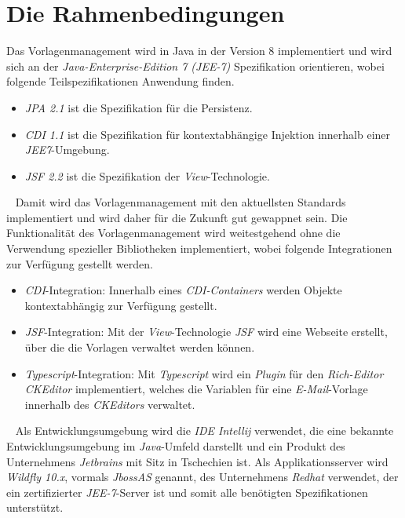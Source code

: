 \section{Die Rahmenbedingungen}
Das Vorlagenmanagement wird in Java in der Version 8 implementiert und wird sich an der \emph{Java-Enterprise-Edition 7 (JEE-7)} Spezifikation orientieren, wobei folgende Teilspezifikationen Anwendung finden.
\begin{itemize}
	\item \emph{JPA 2.1} ist die Spezifikation für die Persistenz.
	\item \emph{CDI 1.1} ist die Spezifikation für kontextabhängige Injektion innerhalb einer \emph{JEE7}-Umgebung.
	\item \emph{JSF 2.2} ist die Spezifikation der \emph{View}-Technologie. 
\end{itemize}
\ \newline
Damit wird das Vorlagenmanagement mit den aktuellsten Standards implementiert und wird daher für die Zukunft gut gewappnet sein. Die Funktionalität des Vorlagenmanagement wird weitestgehend ohne die Verwendung spezieller Bibliotheken implementiert, wobei folgende Integrationen zur Verfügung gestellt werden.
\begin{itemize}
	\item \emph{CDI}-Integration:
	\newline
	Innerhalb eines \emph{CDI-Containers} werden Objekte kontextabhängig zur Verfügung gestellt.
	\item \emph{JSF}-Integration:
	\newline
	Mit der \emph{View}-Technologie \emph{JSF} wird eine Webseite erstellt, über die die Vorlagen verwaltet werden können.
	\item \emph{Typescript}-Integration:
	\newline
	Mit \emph{Typescript} wird ein \emph{Plugin} für den \emph{Rich-Editor CKEditor} implementiert, welches die Variablen für eine \emph{E-Mail}-Vorlage innerhalb des \emph{CKEditors} verwaltet.
\end{itemize} 
\ \newline
Als Entwicklungsumgebung wird die \emph{IDE Intellij} verwendet, die eine bekannte Entwicklungsumgebung im \emph{Java}-Umfeld darstellt und ein Produkt des Unternehmens \emph{Jetbrains} mit Sitz in Tschechien ist. Als Applikationsserver wird \emph{Wildfly 10.x}, vormals \emph{JbossAS} genannt, des Unternehmens  \emph{Redhat} verwendet, der ein zertifizierter \emph{JEE-7}-Server ist und somit alle benötigten Spezifikationen unterstützt.
